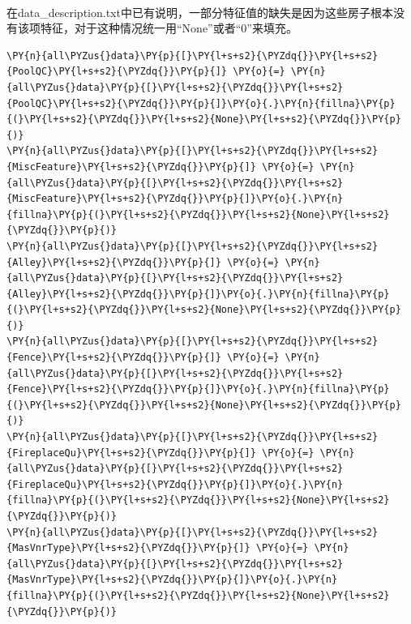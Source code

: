 \documentclass[no-math]{YangThesis}
\begin{document}
\begin{center}
\end{center}
{ \hspace*{\fill} \\}

在data\_description.txt中已有说明，一部分特征值的缺失是因为这些房子根本没有该项特征，对于这种情况统一用``None''或者``0''来填充。

\begin{tcolorbox}[breakable, size=fbox, boxrule=1pt, pad at break*=1mm,colback=cellbackground, colframe=cellborder]
	\begin{Verbatim}[commandchars=\\\{\}]
\PY{n}{all\PYZus{}data}\PY{p}{[}\PY{l+s+s2}{\PYZdq{}}\PY{l+s+s2}{PoolQC}\PY{l+s+s2}{\PYZdq{}}\PY{p}{]} \PY{o}{=} \PY{n}{all\PYZus{}data}\PY{p}{[}\PY{l+s+s2}{\PYZdq{}}\PY{l+s+s2}{PoolQC}\PY{l+s+s2}{\PYZdq{}}\PY{p}{]}\PY{o}{.}\PY{n}{fillna}\PY{p}{(}\PY{l+s+s2}{\PYZdq{}}\PY{l+s+s2}{None}\PY{l+s+s2}{\PYZdq{}}\PY{p}{)}
\PY{n}{all\PYZus{}data}\PY{p}{[}\PY{l+s+s2}{\PYZdq{}}\PY{l+s+s2}{MiscFeature}\PY{l+s+s2}{\PYZdq{}}\PY{p}{]} \PY{o}{=} \PY{n}{all\PYZus{}data}\PY{p}{[}\PY{l+s+s2}{\PYZdq{}}\PY{l+s+s2}{MiscFeature}\PY{l+s+s2}{\PYZdq{}}\PY{p}{]}\PY{o}{.}\PY{n}{fillna}\PY{p}{(}\PY{l+s+s2}{\PYZdq{}}\PY{l+s+s2}{None}\PY{l+s+s2}{\PYZdq{}}\PY{p}{)}
\PY{n}{all\PYZus{}data}\PY{p}{[}\PY{l+s+s2}{\PYZdq{}}\PY{l+s+s2}{Alley}\PY{l+s+s2}{\PYZdq{}}\PY{p}{]} \PY{o}{=} \PY{n}{all\PYZus{}data}\PY{p}{[}\PY{l+s+s2}{\PYZdq{}}\PY{l+s+s2}{Alley}\PY{l+s+s2}{\PYZdq{}}\PY{p}{]}\PY{o}{.}\PY{n}{fillna}\PY{p}{(}\PY{l+s+s2}{\PYZdq{}}\PY{l+s+s2}{None}\PY{l+s+s2}{\PYZdq{}}\PY{p}{)}
\PY{n}{all\PYZus{}data}\PY{p}{[}\PY{l+s+s2}{\PYZdq{}}\PY{l+s+s2}{Fence}\PY{l+s+s2}{\PYZdq{}}\PY{p}{]} \PY{o}{=} \PY{n}{all\PYZus{}data}\PY{p}{[}\PY{l+s+s2}{\PYZdq{}}\PY{l+s+s2}{Fence}\PY{l+s+s2}{\PYZdq{}}\PY{p}{]}\PY{o}{.}\PY{n}{fillna}\PY{p}{(}\PY{l+s+s2}{\PYZdq{}}\PY{l+s+s2}{None}\PY{l+s+s2}{\PYZdq{}}\PY{p}{)}
\PY{n}{all\PYZus{}data}\PY{p}{[}\PY{l+s+s2}{\PYZdq{}}\PY{l+s+s2}{FireplaceQu}\PY{l+s+s2}{\PYZdq{}}\PY{p}{]} \PY{o}{=} \PY{n}{all\PYZus{}data}\PY{p}{[}\PY{l+s+s2}{\PYZdq{}}\PY{l+s+s2}{FireplaceQu}\PY{l+s+s2}{\PYZdq{}}\PY{p}{]}\PY{o}{.}\PY{n}{fillna}\PY{p}{(}\PY{l+s+s2}{\PYZdq{}}\PY{l+s+s2}{None}\PY{l+s+s2}{\PYZdq{}}\PY{p}{)}
\PY{n}{all\PYZus{}data}\PY{p}{[}\PY{l+s+s2}{\PYZdq{}}\PY{l+s+s2}{MasVnrType}\PY{l+s+s2}{\PYZdq{}}\PY{p}{]} \PY{o}{=} \PY{n}{all\PYZus{}data}\PY{p}{[}\PY{l+s+s2}{\PYZdq{}}\PY{l+s+s2}{MasVnrType}\PY{l+s+s2}{\PYZdq{}}\PY{p}{]}\PY{o}{.}\PY{n}{fillna}\PY{p}{(}\PY{l+s+s2}{\PYZdq{}}\PY{l+s+s2}{None}\PY{l+s+s2}{\PYZdq{}}\PY{p}{)}

\end{Verbatim}
\end{tcolorbox}
\end{document}
